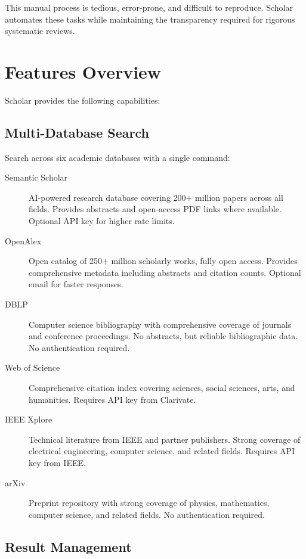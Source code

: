 This manual process is tedious, error-prone, and difficult to reproduce.
Scholar automates these tasks while maintaining the transparency required for 
rigorous systematic reviews.


\section{Features Overview}

Scholar provides the following capabilities:

\subsection{Multi-Database Search}

Search across six academic databases with a single command:
\begin{description}
\item[Semantic Scholar] AI-powered research database covering 200+ million 
  papers across all fields.
  Provides abstracts and open-access PDF links where available.
  Optional API key for higher rate limits.
\item[OpenAlex] Open catalog of 250+ million scholarly works, fully open 
  access.
  Provides comprehensive metadata including abstracts and citation counts.
  Optional email for faster responses.
\item[DBLP] Computer science bibliography with comprehensive coverage of 
  journals and conference proceedings.
  No abstracts, but reliable bibliographic data.
  No authentication required.
\item[Web of Science] Comprehensive citation index covering sciences, social 
  sciences, arts, and humanities.
  Requires API key from Clarivate.
\item[IEEE Xplore] Technical literature from IEEE and partner publishers.
  Strong coverage of electrical engineering, computer science, and related 
  fields.
  Requires API key from IEEE.
\item[arXiv] Preprint repository with strong coverage of physics, mathematics,
  computer science, and related fields.
  No authentication required.
\end{description}

\subsection{Result Management}

